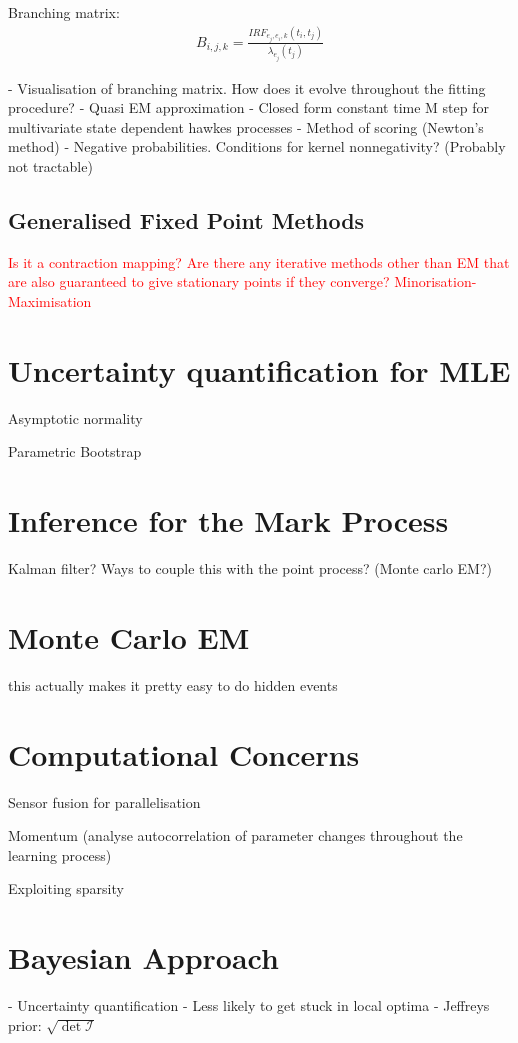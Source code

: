 \documentclass[honours,12pt]{unswthesis}
\numberwithin{equation}{section}
\begin{document}
Branching matrix:
\begin{align*}
	B_{i,j,k} = \frac{IRF_{e_j,e_i,k}(t_i,t_j)}{\lambda_{e_j}(t_j)}
\end{align*}

- Visualisation of branching matrix. How does it evolve throughout the fitting procedure?
- Quasi EM approximation
- Closed form constant time M step for multivariate state dependent hawkes processes
- Method of scoring (Newton's method)
- Negative probabilities. Conditions for kernel nonnegativity? (Probably not tractable)

\subsection{Generalised Fixed Point Methods}
\textcolor{red}{Is it a contraction mapping?}
\textcolor{red}{Are there any iterative methods other than EM that are also guaranteed to give stationary points if they converge?}
\textcolor{red}{Minorisation-Maximisation}

\section{Uncertainty quantification for MLE}
Asymptotic normality

Parametric Bootstrap

\section{Inference for the Mark Process}
Kalman filter? Ways to couple this with the point process? (Monte carlo EM?)

\section{Monte Carlo EM}
this actually makes it pretty easy to do hidden events

\section{Computational Concerns}
Sensor fusion for parallelisation

Momentum (analyse autocorrelation of parameter changes throughout the learning process)

Exploiting sparsity \cite{NickelLe}

\section{Bayesian Approach}
- Uncertainty quantification
- Less likely to get stuck in local optima
- Jeffreys prior: $\sqrt{\det \mathcal{I}}$
\end{document}
